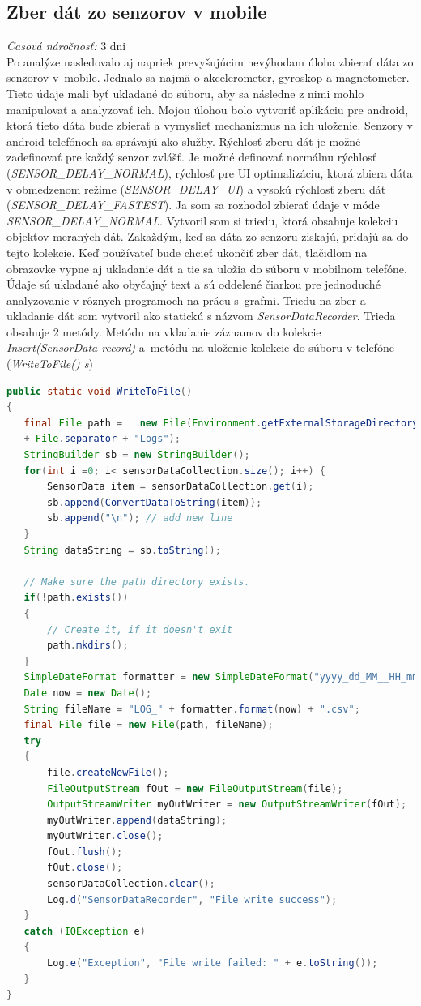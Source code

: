 \documentclass[11pt, oneside]{report}
\begin{document}
\subsection{Zber dát zo senzorov  v mobile}
\textit{Časová náročnosť:} 3 dni\\
Po  analýze nasledovalo aj napriek prevyšujúcim nevýhodam úloha zbierať dáta zo senzorov v~mobile.  Jednalo sa najmä o akcelerometer, gyroskop a magnetometer. Tieto údaje mali byť  ukladané do súboru, aby sa následne z nimi mohlo manipulovať a analyzovať ich. Mojou úlohou bolo vytvoriť  aplikáciu pre android, ktorá tieto dáta bude zbierať a vymyslieť mechanizmus na ich uloženie. Senzory v android telefónoch sa správajú ako služby. Rýchlosť zberu dát je možné zadefinovať pre každý senzor zvlášť. Je možné  definovať  normálnu rýchlosť (\textit{SENSOR\_DELAY\_NORMAL}),  rýchlosť pre UI optimalizáciu, ktorá zbiera  dáta v obmedzenom režime (\textit{SENSOR\_DELAY\_UI}) a  vysokú rýchlosť zberu dát (\textit{SENSOR\_DELAY\_FASTEST}). Ja som sa rozhodol zbierať  údaje v móde \textit{SENSOR\_DELAY\_NORMAL}. Vytvoril som si  triedu, ktorá obsahuje kolekciu objektov meraných dát. Zakaždým, keď sa dáta zo senzoru ziskajú, pridajú sa do tejto kolekcie. Keď používateľ bude chcieť ukončiť zber dát, tlačidlom na obrazovke vypne aj ukladanie dát a tie sa uložia do súboru v mobilnom telefóne. Údaje sú ukladané ako obyčajný text a sú oddelené čiarkou pre jednoduché analyzovanie v rôznych programoch na prácu s~grafmi. Triedu na zber a ukladanie dát  som vytvoril ako statickú s názvom \textit{SensorDataRecorder}. Trieda obsahuje  2 metódy. Metódu na vkladanie záznamov do kolekcie  \textit{Insert(SensorData record)}  a~metódu na uloženie kolekcie do súboru v telefóne (\textit{WriteToFile() s})
\newpage
\lstset{language=Java}
\begin{lstlisting}[language=Java,showstringspaces=false, caption= Metóda na ukladanie záznamov do mobilného telefónu,captionpos=b]
public static void WriteToFile()
{
   final File path =   new File(Environment.getExternalStorageDirectory()
   + File.separator + "Logs");
   StringBuilder sb = new StringBuilder();
   for(int i =0; i< sensorDataCollection.size(); i++) {
       SensorData item = sensorDataCollection.get(i);
       sb.append(ConvertDataToString(item));
       sb.append("\n"); // add new line
   }
   String dataString = sb.toString();
	
   // Make sure the path directory exists.
   if(!path.exists())
   {
       // Create it, if it doesn't exit
       path.mkdirs();
   }
   SimpleDateFormat formatter = new SimpleDateFormat("yyyy_dd_MM__HH_mm_ss");
   Date now = new Date();
   String fileName = "LOG_" + formatter.format(now) + ".csv";
   final File file = new File(path, fileName);
   try
   {
       file.createNewFile();
       FileOutputStream fOut = new FileOutputStream(file);
       OutputStreamWriter myOutWriter = new OutputStreamWriter(fOut);
       myOutWriter.append(dataString);
       myOutWriter.close();
       fOut.flush();
       fOut.close();
       sensorDataCollection.clear();
       Log.d("SensorDataRecorder", "File write success");
   }
   catch (IOException e)
   {
       Log.e("Exception", "File write failed: " + e.toString());
   }
}
\end{lstlisting}
\end{document}
